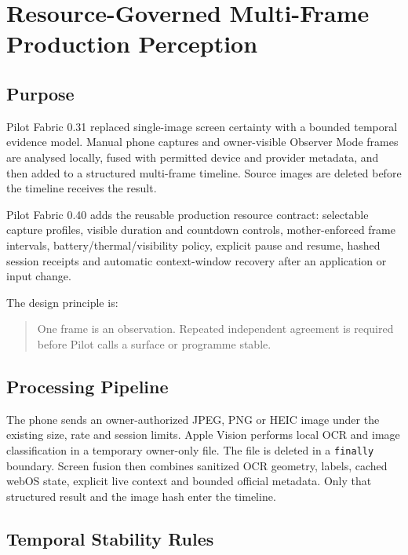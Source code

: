 \section{Resource-Governed Multi-Frame Production Perception}
\label{sec:pilot-production-perception}

\subsection{Purpose}

Pilot Fabric 0.31 replaced single-image screen certainty with a bounded temporal
evidence model.  Manual phone captures and owner-visible Observer Mode frames are
analysed locally, fused with permitted device and provider metadata, and then
added to a structured multi-frame timeline.  Source images are deleted before
the timeline receives the result.

Pilot Fabric 0.40 adds the reusable production resource contract: selectable
capture profiles, visible duration and countdown controls, mother-enforced frame
intervals, battery/thermal/visibility policy, explicit pause and resume, hashed
session receipts and automatic context-window recovery after an application or
input change.

The design principle is:

\begin{quote}
One frame is an observation.  Repeated independent agreement is required before
Pilot calls a surface or programme stable.
\end{quote}

\subsection{Processing Pipeline}

The phone sends an owner-authorized JPEG, PNG or HEIC image under the existing
size, rate and session limits.  Apple Vision performs local OCR and image
classification in a temporary owner-only file.  The file is deleted in a
\texttt{finally} boundary.  Screen fusion then combines sanitized OCR geometry,
labels, cached webOS state, explicit live context and bounded official metadata.
Only that structured result and the image hash enter the timeline.

\subsection{Temporal Stability Rules}


